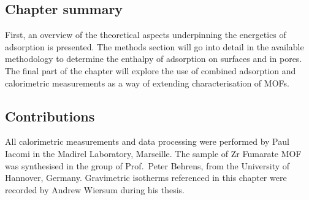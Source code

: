 \subsection*{Chapter summary}

First, an overview of the theoretical aspects underpinning
the energetics of adsorption is presented. The methods
section will go into detail in the available methodology
to determine the enthalpy of adsorption on surfaces and in
pores. The final part of the chapter will explore the use
of combined adsorption and calorimetric measurements
as a way of extending characterisation of \glspl{MOF}.

\subsection*{Contributions}

All calorimetric measurements and data processing were
performed by Paul Iacomi in the Madirel Laboratory, Marseille.
The sample of Zr Fumarate \gls{MOF} was synthesised in the group
of Prof.\ Peter Behrens, from the University of Hannover,
Germany. Gravimetric isotherms referenced in this chapter were
recorded by Andrew Wiersum during his thesis.